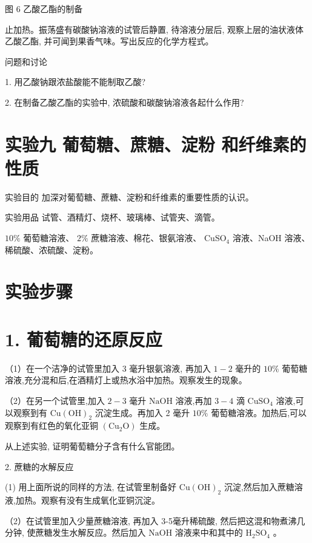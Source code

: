 \documentclass[10pt]{article}
\begin{document}
图 6 乙酸乙酯的制备

止加热。振荡盛有碳酸钠溶液的试管后静置, 待溶液分层后, 观察上层的油状液体乙酸乙酯, 并可闻到果香气味。写出反应的化学方程式。

问题和讨论

1. 用乙酸钠跟浓盐酸能不能制取乙酸?

2. 在制备乙酸乙酯的实验中, 浓硫酸和碳酸钠溶液各起什么作用?

\section*{实验九 葡萄糖、蔗糖、淀粉 和纤维素的性质}

实验目的 加深对葡萄糖、蔗糖、淀粉和纤维素的重要性质的认识。

实验用品 试管、酒精灯、烧杯、玻璃棒、试管夹、滴管。

\({10}\%\) 葡萄糖溶液、 \(2\%\) 蔗糖溶液、棉花、银氨溶液、 \({\mathrm{{CuSO}}}_{4}\) 溶液、NaOH 溶液、稀硫酸、浓硫酸、淀粉。

\section*{实验步骤}

\section*{1. 葡萄糖的还原反应}

（1）在一个洁净的试管里加入 3 毫升银氨溶液, 再加入 \(1 - 2\) 毫升的 \({10}\%\) 葡萄糖溶液,充分混和后,在酒精灯上或热水浴中加热。观察发生的现象。

（2）在另一个试管里,加入 \(2 - 3\) 毫升 \(\mathrm{{NaOH}}\) 溶液,再加 \(3 - 4\) 滴 \({\mathrm{{CuSO}}}_{4}\) 溶液,可以观察到有 \(\mathrm{{Cu}}{\left( \mathrm{{OH}}\right) }_{2}\) 沉淀生成。再加入 2 毫升 \({10}\%\) 葡萄糖溶液。加热后,可以观察到有红色的氧化亚铜 \(\left( {{\mathrm{{Cu}}}_{2}\mathrm{O}}\right)\) 生成。

从上述实验, 证明葡萄糖分子含有什么官能团。

2. 蔗糖的水解反应

(1) 用上面所说的同样的方法, 在试管里制备好 \(\mathrm{{Cu}}{\left( \mathrm{{OH}}\right) }_{2}\) 沉淀,然后加入蔗糖溶液,加热。观察有没有生成氧化亚铜沉淀。

（2）在试管里加入少量蔗糖溶液, 再加入 3-5毫升稀硫酸, 然后把这混和物煮沸几分钟, 使蔗糖发生水解反应。然后加入 \(\mathrm{{NaOH}}\) 溶液来中和其中的 \({\mathrm{H}}_{2}{\mathrm{{SO}}}_{4}\) 。
\end{document}
